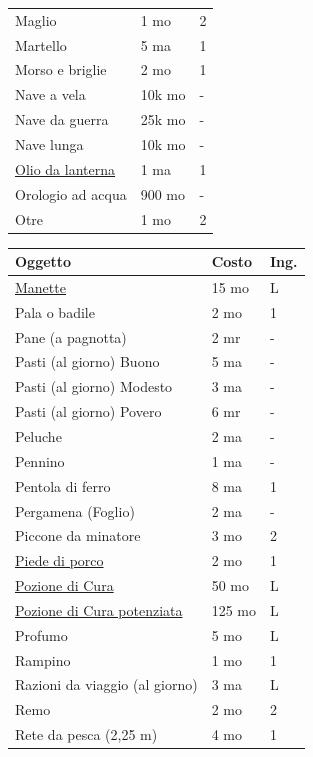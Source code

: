 \begin{multicols}{2}
\begin{tabular}{p{5cm}p{1.5cm}p{0.7cm}}
Maglio & 1 mo & 2 \\
\rowcolor{gray!20}Martello & 5 ma & 1 \\
Morso e briglie & 2 mo & 1 \\
\rowcolor{gray!20}Nave a vela & 10k mo & - \\
Nave da guerra & 25k mo & - \\
\rowcolor{gray!20}Nave lunga & 10k mo & - \\
\hyperlink{Olio da lanterna}{Olio da lanterna} & 1 ma & 1 \\
\rowcolor{gray!20}Orologio ad acqua & 900 mo & - \\
Otre & 1 mo & 2 \\
\end{tabular}
\noindent\begin{tabular}{p{5.1cm}p{1.5cm}p{0.7cm}}
\toprule
\rowcolor{gray!20}\textbf{Oggetto} & \textbf{Costo} & \textbf{Ing.} \\
\toprule
\hyperlink{Manette}{Manette} & 15 mo & L \\
\rowcolor{gray!20}Pala o badile & 2 mo & 1 \\
Pane (a pagnotta) & 2 mr & - \\
\rowcolor{gray!20}Pasti (al giorno) Buono & 5 ma & - \\
Pasti (al giorno) Modesto & 3 ma & - \\
\rowcolor{gray!20}Pasti (al giorno) Povero & 6 mr & - \\
Peluche & 2 ma & - \\
\rowcolor{gray!20}Pennino & 1 ma & - \\
Pentola di ferro & 8 ma & 1 \\
\rowcolor{gray!20}Pergamena (Foglio) & 2 ma & - \\
Piccone da minatore & 3 mo & 2 \\
\rowcolor{gray!20}\hyperlink{piedediporco}{Piede di porco} & 2 mo & 1 \\
\hyperlink{Equip Pozione di Cura}{Pozione di Cura} & 50 mo & L \\
\rowcolor{gray!20}\hyperlink{Equip Pozione di Cura potenziata}{Pozione di Cura potenziata} & 125 mo & L \\
Profumo & 5 mo & L \\
\rowcolor{gray!20}Rampino & 1 mo & 1 \\
Razioni da viaggio (al giorno) & 3 ma & L \\
\rowcolor{gray!20}Remo & 2 mo & 2 \\
Rete da pesca (2,25 m) & 4 mo & 1 \\

\end{tabular}
\end{multicols}
